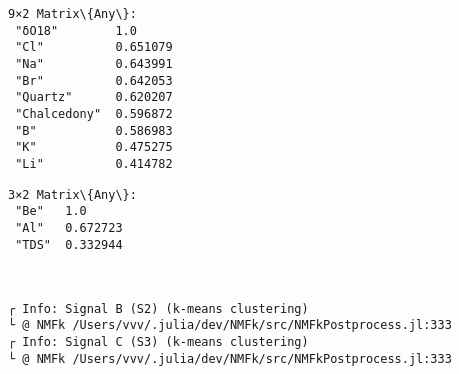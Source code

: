 \documentclass[11pt]{article}
\begin{document}
    
    \begin{Verbatim}[commandchars=\\\{\}]
9×2 Matrix\{Any\}:
 "δO18"        1.0
 "Cl"          0.651079
 "Na"          0.643991
 "Br"          0.642053
 "Quartz"      0.620207
 "Chalcedony"  0.596872
 "B"           0.586983
 "K"           0.475275
 "Li"          0.414782
    \end{Verbatim}

    
    
    \begin{Verbatim}[commandchars=\\\{\}]
3×2 Matrix\{Any\}:
 "Be"   1.0
 "Al"   0.672723
 "TDS"  0.332944
    \end{Verbatim}

    
    \begin{center}
    \end{center}
    { \hspace*{\fill} \\}
    
    \begin{Verbatim}[commandchars=\\\{\}]
┌ Info: Signal B (S2) (k-means clustering)
└ @ NMFk /Users/vvv/.julia/dev/NMFk/src/NMFkPostprocess.jl:333
┌ Info: Signal C (S3) (k-means clustering)
└ @ NMFk /Users/vvv/.julia/dev/NMFk/src/NMFkPostprocess.jl:333
    \end{Verbatim}

    \begin{center}
    \end{center}
    { \hspace*{\fill} \\}
    
    \begin{Verbatim}[commandchars=\\\{\}]

    \end{Verbatim}

    \begin{center}
    \end{center}
    { \hspace*{\fill} \\}
    
\end{document}

